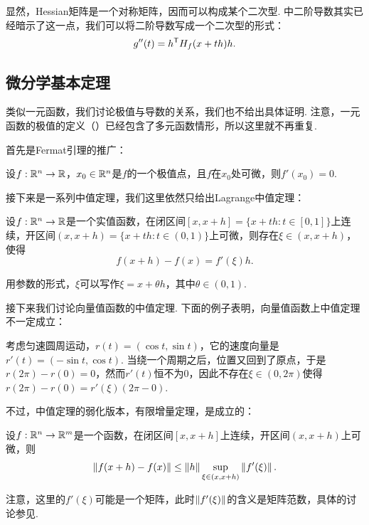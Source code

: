 显然，Hessian矩阵是一个对称矩阵，因而可以构成某个二次型.  中二阶导数其实已经暗示了这一点，我们可以将二阶导数写成一个二次型的形式：
\[g''(t)=h^{\mathsf{T}} H_f(x+th)h.\]

\subsection{微分学基本定理}

类似一元函数，我们讨论极值与导数的关系，我们也不给出具体证明. 注意，一元函数的极值的定义（）已经包含了多元函数情形，所以这里就不再重复. 

首先是Fermat引理的推广：

\begin{lemma}[Fermat引理]\label{lemma:fermat-multi}
    设$f:\mathbb{R}^n\to\mathbb{R}$，$x_0\in\mathbb{R}^n$是$f$的一个极值点，且$f$在$x_0$处可微，则$f'(x_0)=0$.
\end{lemma}

接下来是一系列中值定理，我们这里依然只给出Lagrange中值定理：

\begin{theorem}[Lagrange中值定理]\label{thm:lagrange-mid-multi}
    设$f:\mathbb{R}^n\to\mathbb{R}$是一个实值函数，在闭区间$[x,x+h]=\{x+th:t\in[0,1]\}$上连续，开区间$(x,x+h)=\{x+th:t\in(0,1)\}$上可微，则存在$\xi\in(x,x+h)$，使得
    \[
        f(x+h)-f(x)=f'(\xi)h.
    \]
\end{theorem}
用参数的形式，$\xi$可以写作$\xi=x+\theta h$，其中$\theta\in(0,1)$.

接下来我们讨论向量值函数的中值定理. 下面的例子表明，向量值函数上中值定理不一定成立：
\begin{example}
考虑匀速圆周运动，$r(t)=(\cos t,\sin t)$，它的速度向量是$r'(t)=(-\sin t,\cos t)$. 当绕一个周期之后，位置又回到了原点，于是$r(2\pi)-r(0)=0$，然而$r'(t)$恒不为$0$，因此不存在$\xi\in(0,2\pi)$使得$r(2\pi)-r(0)=r'(\xi)(2\pi-0)$.
\end{example}

不过，中值定理的弱化版本，有限增量定理，是成立的：

\begin{theorem}[Lagrange有限增量定理]\label{thm:lagrange-finite-multi}
    设$f:\mathbb{R}^n\to\mathbb{R}^m$是一个函数，在闭区间$[x,x+h]$上连续，开区间$(x,x+h)$上可微，则
    \[
        \left\|f(x+h)-f(x)\right\|\leq \left\|h\right\|\sup_{\xi\in(x,x+h)}\left\|f'(\xi)\right\|.
    \]
\end{theorem}

注意，这里的$f'(\xi)$可能是一个矩阵，此时$\left\|f'(\xi)\right\|$的含义是矩阵范数，具体的讨论参见. 

